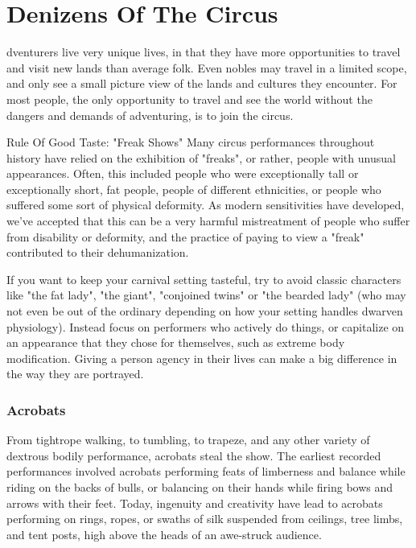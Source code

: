 \documentclass[10pt,a4paper,twoside,bg=print,twocolumn,openany,nodeprecatedcode]{dndbook}
\begin{document}
\chapter{Denizens Of The Circus}
dventurers live very unique lives, in that they have more opportunities to travel and visit new lands than average folk. Even nobles may travel in a limited scope, and only see a small picture view of the lands and cultures they encounter. For most people, the only opportunity to travel and see the world without the dangers and demands of adventuring, is to join the circus.

\begin{DndSidebar}[float=!b]{Rule Of Good Taste: "Freak Shows"}
Many circus performances throughout history have relied on the exhibition of "freaks", or rather, people with unusual appearances. Often, this included people who were exceptionally tall or exceptionally short, fat people, people of different ethnicities, or people who suffered some sort of physical deformity. As modern sensitivities have developed, we've accepted that this can be a very harmful mistreatment of people who suffer from disability or deformity, and the practice of paying to view a "freak" contributed to their dehumanization.


If you want to keep your carnival setting tasteful, try to avoid classic characters like "the fat lady", "the giant", "conjoined twins" or "the bearded lady" (who may not even be out of the ordinary depending on how your setting handles dwarven physiology). Instead focus on performers who actively do things, or capitalize on an appearance that they chose for themselves, such as extreme body modification. Giving a person agency in their lives can make a big difference in the way they are portrayed.


\end{DndSidebar}

\subsection{Acrobats}
From tightrope walking, to tumbling, to trapeze, and any other variety of dextrous bodily performance, acrobats steal the show. The earliest recorded performances involved acrobats performing feats of limberness and balance while riding on the backs of bulls, or balancing on their hands while firing bows and arrows with their feet. Today, ingenuity and creativity have lead to acrobats performing on rings, ropes, or swaths of silk suspended from ceilings, tree limbs, and tent posts, high above the heads of an awe-struck audience.
\end{document}
